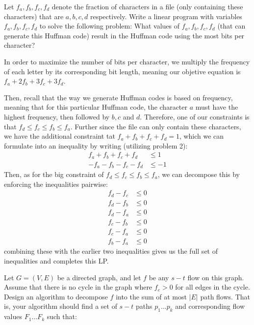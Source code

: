 \documentclass[11pt]{article}
\begin{document}
Let $f_a, f_b, f_c, f_d$ denote the fraction of characters in a file (only containing these characters) that are $a, b, c, d$ respectively. Write a linear program with variables $f_a, f_b, f_c, f_d$ to solve the following problem: What values of $f_a, f_b, f_c, f_d$ (that can generate this Huffman code) result in the Huffman code using the most bits per character? 

\begin{solution}
	In order to maximize the number of bits per character, we multiply the frequency of each letter 
	by its corresponding bit length, meaning our objetive equation is \(f_a + 2f_b + 3f_c + 3f_d\). 

	Then, recall that the way we generate Huffman codes is based on frequency, meaning that for this particular 
	Huffman code, the character \(a\) must have the highest frequency, then followed by \(b, c \) and \(d\).
	Therefore, one of our constraints is that \(f_d \le  f_c \le  f_b \le  f_a\). Further since the 
	file can only contain these characters, we have the additional constraint tat \(f_a + f_b + f_c + f_d = 1\), 
	which we can formulate into an inequality by writing (utilizing problem 2): 
	\begin{align*}
		f_a + f_b + f_c + f_d &\le  1\\
		-f_a - f_b - f_c - f_d & \le  -1
	\end{align*}
	Then, as for the big constraint of \(f_d \le  f_c \le  f_b \le  f_a\), we can decompose this by enforcing 
	the inequalities pairwise:
	\begin{align*}
		f_d - f_c &\le  0\\
		f_d - f_b &\le  0\\
		f_d - f_a & \le  0\\
		f_c - f_b&\le  0\\
		f_c - f_a &\le  0\\
		f_b - f_a &\le  0
	\end{align*}
	combining these with the earlier two inequalities gives us the full set of inequalities and completes 
	this LP.
\end{solution}
\newpage


Let $G = (V, E)$ be a directed graph, and let $f$ be any $s-t$ flow on this graph. Assume that there is no cycle in the graph where $f_e > 0$ for all edges in the cycle. Design an algorithm to decompose $f$ into the sum of at most $|E|$ path flows. That is, your algorithm should find a set of $s-t$ paths $p_1 \ldots p_k$ and corresponding flow values $F_1 \ldots F_k$ such that:
\end{document}
